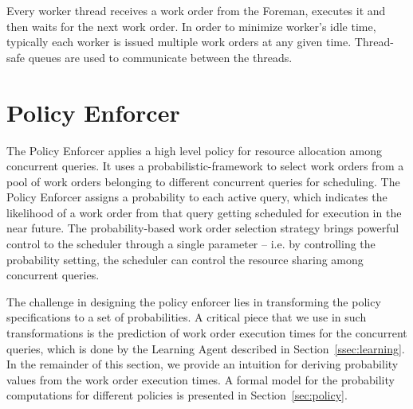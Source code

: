 Every worker thread receives a work order from the Foreman, executes it and then waits for 
the next work order.
In order to minimize worker's idle time, typically each worker is issued multiple work 
orders at any given time. 
Thread-safe queues are used to communicate between the threads.


\section{Policy Enforcer}\label{apx:policy-enforcer}
The Policy Enforcer applies a high level policy for resource allocation among concurrent queries. 
It uses a probabilistic-framework to select work orders from a pool of work orders 
belonging to different concurrent queries for scheduling. 
The Policy Enforcer assigns a probability to each active query, which indicates the likelihood of a work order from that query getting scheduled for execution in the near future. 
The probability-based work order selection strategy brings powerful control to the scheduler through a single parameter -- i.e. by controlling the probability 
setting, the scheduler can control the resource sharing among concurrent queries. 

The challenge in designing the policy enforcer lies in transforming the policy specifications to a set of probabilities. 
A critical piece that we use in such transformations is the prediction of work order 
execution times for the concurrent queries, which is done by the Learning Agent described in Section~\ref{ssec:learning}. %
In the remainder of this section, we provide an intuition for deriving probability values from the work order execution times. 
A formal model for the probability computations for different policies is presented in Section~\ref{sec:policy}.

